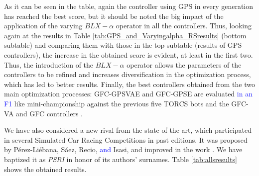 \documentclass[10pt,journal,compsoc]{IEEEtran}
\begin{document}
%

As it can be seen in the table, again the controller using GPS in
every generation has reached the best score, but it should be noted the
big impact of the application of the varying $BLX-\alpha$ operator in
all the controllers. Thus, looking again at the results in Table \ref{tab:GPS_and_Varyingalpha_RSresults} (bottom subtable) 
and comparing them with those in the top subtable (results of GPS controllers), the increase in the obtained score is evident, at least in the first
two. %
Thus, the introduction of the $BLX-\alpha$ operator allows the parameters of the controllers to be refined and increases diversification in the optimization process, which has led to better results.
Finally, the best controllers obtained from the two main optimization
processes: {\sf GFC-GPSVAE} and {\sf GFC-GPSE} are evaluated \textcolor{blue}{in an F1} like mini-championship against the previous five TORCS bots and the {\sf GFC-VA}\cite{DBLP:conf/cig/SalemMG19} and {\sf GFC} controllers  \cite{salem_cig2018}. 



We have also considered a new rival from the state of the art, which participated in several Simulated Car Racing Competitions in past editions. 
It was proposed by P{\'e}rez-Li{\'e}bana, S{\'a}ez, Recio, \textcolor{blue}{and} Isasi, and improved in the work \cite{PerezEvolvingFuzzy09}. We have baptized it as \textit{PSRI} in honor of its authors' surnames. 
Table \ref{tab:allsresults} shows the obtained results.
%
\end{document}
